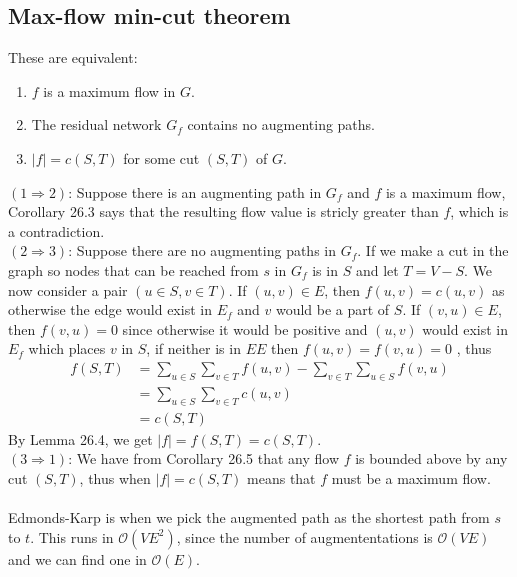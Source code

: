 \documentclass[a4paper]{article}
\begin{document}
\subsection*{Max-flow min-cut theorem}
These are equivalent:
\begin{enumerate}
  \item $f$ is a maximum flow in $G$.
  \item The residual network $G_f$ contains no augmenting paths.
  \item $|f|=c(S,T)$ for some cut $(S,T)$ of $G$.
\end{enumerate}
$(1\Rightarrow 2)$: Suppose there is an augmenting path in $G_f$ and $f$ is a maximum flow, Corollary 26.3 says that the resulting flow value is stricly greater than $f$, which is a contradiction. \\
$(2\Rightarrow 3)$: Suppose there are no augmenting paths in $G_f$. If we make a cut in the graph so nodes that can be reached from $s$ in $G_f$ is in $S$ and let $T=V-S$. We now consider a pair $(u\in S, v\in T)$. If $(u,v)\in E$, then $f(u,v)=c(u,v)$ as otherwise the edge would exist in $E_f$ and $v$ would be a part of $S$. If $(v,u)\in E$, then $f(v,u)=0$ since otherwise it would be positive and $(u,v)$ would exist in $E_f$ which places $v$ in $S$, if neither is in $EE$ then $f(u,v)=f(v,u)=0$ , thus
\begin{align*}
  f(S,T)&=\sum_{u\in S}\sum_{v\in T}f(u,v)-\sum_{v\in T}\sum_{u\in S}f(v,u)  \\
  &=\sum_{u\in S}\sum_{v\in T}c(u,v) \\
  &=c(S,T)
\end{align*}
By Lemma 26.4, we get $|f|=f(S,T)=c(S,T)$.\\
$(3\Rightarrow 1)$: We have from Corollary 26.5 that any flow $f$ is bounded above by any cut $(S,T)$, thus when $|f|=c(S,T)$ means that $f$ must be a maximum flow. \\
\\
Edmonds-Karp is when we pick the augmented path as the shortest path from $s$ to $t$. This runs in $\mathcal{O}(VE^2)$, since the number of augmententations is $\mathcal{O}(VE)$ and we can find one in $\mathcal{O}(E)$.
\end{document}
